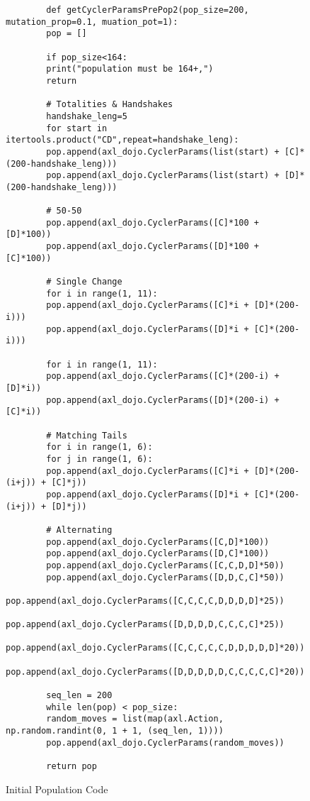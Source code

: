 \begin{figure}
    \begin{verbatim}
        def getCyclerParamsPrePop2(pop_size=200, mutation_prop=0.1, muation_pot=1):
        pop = []

        if pop_size<164:
        print("population must be 164+,")
        return

        # Totalities & Handshakes
        handshake_leng=5
        for start in itertools.product("CD",repeat=handshake_leng):
        pop.append(axl_dojo.CyclerParams(list(start) + [C]*(200-handshake_leng)))
        pop.append(axl_dojo.CyclerParams(list(start) + [D]*(200-handshake_leng)))

        # 50-50
        pop.append(axl_dojo.CyclerParams([C]*100 + [D]*100))
        pop.append(axl_dojo.CyclerParams([D]*100 + [C]*100))

        # Single Change
        for i in range(1, 11):
        pop.append(axl_dojo.CyclerParams([C]*i + [D]*(200-i)))
        pop.append(axl_dojo.CyclerParams([D]*i + [C]*(200-i)))

        for i in range(1, 11):
        pop.append(axl_dojo.CyclerParams([C]*(200-i) + [D]*i))
        pop.append(axl_dojo.CyclerParams([D]*(200-i) + [C]*i))

        # Matching Tails
        for i in range(1, 6):
        for j in range(1, 6):
        pop.append(axl_dojo.CyclerParams([C]*i + [D]*(200-(i+j)) + [C]*j))
        pop.append(axl_dojo.CyclerParams([D]*i + [C]*(200-(i+j)) + [D]*j))

        # Alternating
        pop.append(axl_dojo.CyclerParams([C,D]*100))
        pop.append(axl_dojo.CyclerParams([D,C]*100))
        pop.append(axl_dojo.CyclerParams([C,C,D,D]*50))
        pop.append(axl_dojo.CyclerParams([D,D,C,C]*50))
        pop.append(axl_dojo.CyclerParams([C,C,C,C,D,D,D,D]*25))
        pop.append(axl_dojo.CyclerParams([D,D,D,D,C,C,C,C]*25))
        pop.append(axl_dojo.CyclerParams([C,C,C,C,C,D,D,D,D,D]*20))
        pop.append(axl_dojo.CyclerParams([D,D,D,D,D,C,C,C,C,C]*20))

        seq_len = 200
        while len(pop) < pop_size:
        random_moves = list(map(axl.Action, np.random.randint(0, 1 + 1, (seq_len, 1))))
        pop.append(axl_dojo.CyclerParams(random_moves))

        return pop
    \end{verbatim}
    \caption{Initial Population Code}\label{code:initialPopulationCode}
\end{figure}

